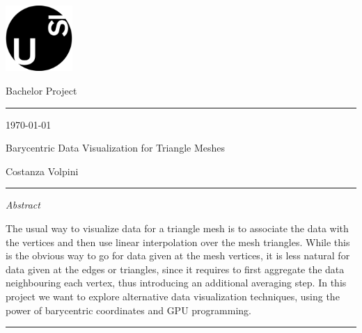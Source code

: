 \documentclass[12pt]{article}
\theoremstyle{definition}
\theoremstyle{definition}
\theoremstyle{plain}
\theoremstyle{plain}
\theoremstyle{plain}
\theoremstyle{plain}
\theoremstyle{definition}
\theoremstyle{remark}
\theoremstyle{remark}
\theoremstyle{remark}
\theoremstyle{remark}
\newcommand{\SUPERTITLE}{Bachelor Project}
\newcommand{\TITLE}{Barycentric Data Visualization for Triangle Meshes}
\newcommand{\AUTHOR}{Costanza Volpini}
\begin{document}

\thispagestyle{empty}

\includegraphics[height=2.5cm]{usi-logo.png} \vspace{-1.42cm}

\begin{flushright}
  {\large \SUPERTITLE}\vspace{-.5cm}

  \rule{0.925\textwidth}{0.4pt}\vspace{-.2cm}

  {\small \today}
\end{flushright}

\vspace{2cm} {\fontsize{20pt}{20pt}\selectfont \TITLE }

\vspace{1cm} {\Large \AUTHOR}

\vspace{-.2cm}\rule{\textwidth}{0.4pt}

\textit{Abstract}

The usual way to visualize data for a triangle mesh is to associate the data with the vertices and then use linear interpolation over the mesh triangles. While this is the obvious way to go for data given at the mesh vertices, it is less natural for data given at the edges or triangles, since it requires to first aggregate the data neighbouring each vertex, thus introducing an additional averaging step.
In this project we want to explore alternative data visualization techniques, using the power of barycentric coordinates and GPU programming.


\vspace{\fill}
\rule{\textwidth}{0.4pt}
\end{document}
